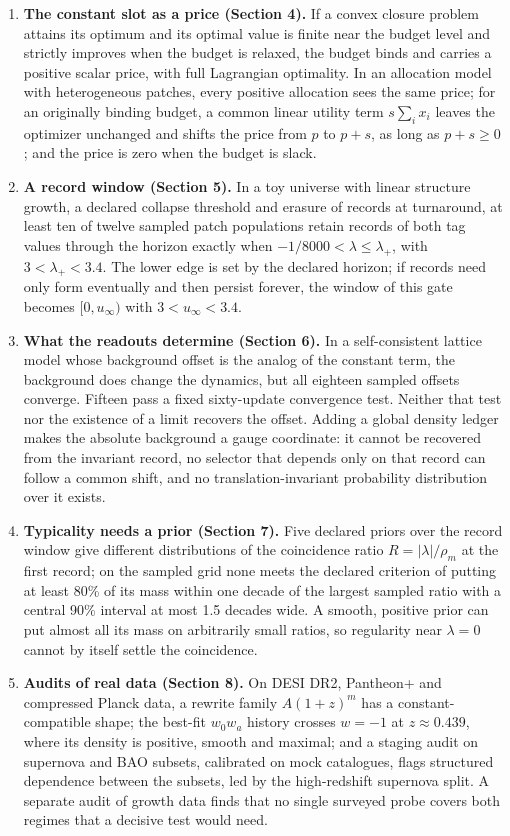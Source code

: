 \begin{enumerate}
\def\labelenumi{\arabic{enumi}.}
\tightlist
\item
  \textbf{The constant slot as a price (Section 4).} If a convex closure
  problem attains its optimum and its optimal value is finite near the
  budget level and strictly improves when the budget is relaxed, the
  budget binds and carries a positive scalar price, with full Lagrangian
  optimality. In an allocation model with heterogeneous patches, every
  positive allocation sees the same price; for an originally binding
  budget, a common linear utility term \(s\sum_ix_i\) leaves the
  optimizer unchanged and shifts the price from \(p\) to \(p+s\), as
  long as \(p+s\ge0\); and the price is zero when the budget is slack.
\item
  \textbf{A record window (Section 5).} In a toy universe with linear
  structure growth, a declared collapse threshold and erasure of records
  at turnaround, at least ten of twelve sampled patch populations retain
  records of both tag values through the horizon exactly when
  \(-1/8000<\lambda\le\lambda_+\), with \(3<\lambda_+<3.4\). The lower
  edge is set by the declared horizon; if records need only form
  eventually and then persist forever, the window of this gate becomes
  \([0,u_\infty)\) with \(3<u_\infty<3.4\).
\item
  \textbf{What the readouts determine (Section 6).} In a self-consistent
  lattice model whose background offset is the analog of the constant
  term, the background does change the dynamics, but all eighteen
  sampled offsets converge. Fifteen pass a fixed sixty-update
  convergence test. Neither that test nor the existence of a limit
  recovers the offset. Adding a global density ledger makes the absolute
  background a gauge coordinate: it cannot be recovered from the
  invariant record, no selector that depends only on that record can
  follow a common shift, and no translation-invariant probability
  distribution over it exists.
\item
  \textbf{Typicality needs a prior (Section 7).} Five declared priors
  over the record window give different distributions of the coincidence
  ratio \(R=|\lambda|/\rho_m\) at the first record; on the sampled grid
  none meets the declared criterion of putting at least 80\% of its mass
  within one decade of the largest sampled ratio with a central 90\%
  interval at most 1.5 decades wide. A smooth, positive prior can put
  almost all its mass on arbitrarily small ratios, so regularity near
  \(\lambda=0\) cannot by itself settle the coincidence.
\item
  \textbf{Audits of real data (Section 8).} On DESI DR2, Pantheon+ and
  compressed Planck data, a rewrite family \(A(1+z)^m\) has a
  constant-compatible shape; the best-fit \(w_0w_a\) history crosses
  \(w=-1\) at \(z\approx0.439\), where its density is positive, smooth
  and maximal; and a staging audit on supernova and BAO subsets,
  calibrated on mock catalogues, flags structured dependence between the
  subsets, led by the high-redshift supernova split. A separate audit of
  growth data finds that no single surveyed probe covers both regimes
  that a decisive test would need.
\end{enumerate}

